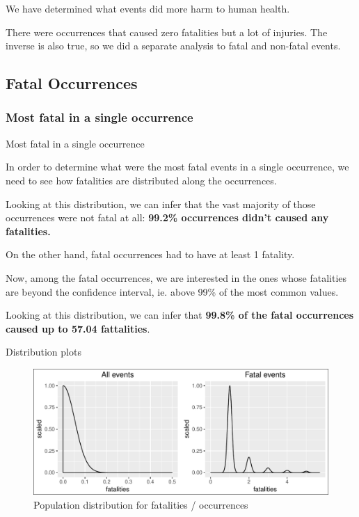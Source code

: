 \documentclass[]{article}
\begin{document}
We have determined what events did more harm to human health.

There were occurrences that caused zero fatalities but a lot of
injuries. The inverse is also true, so we did a separate analysis to
fatal and non-fatal events.

\subsection{Fatal Occurrences}\label{fatal-occurrences}

\subsubsection{Most fatal in a single
occurrence}\label{most-fatal-in-a-single-occurrence}

Most fatal in a single occurrence

In order to determine what were the most fatal events in a single
occurrence, we need to see how fatalities are distributed along the
occurrences.

Looking at this distribution, we can infer that the vast majority of
those occurrences were not fatal at all: \textbf{99.2\% occurrences
didn't caused any fatalities.}

On the other hand, fatal occurrences had to have at least 1 fatality.

Now, among the fatal occurrences, we are interested in the ones whose
fatalities are beyond the confidence interval, ie. above 99\% of the
most common values.

Looking at this distribution, we can infer that \textbf{99.8\% of the
fatal occurrences caused up to 57.04 fattalities}.

Distribution plots

\begin{figure}[htbp]
\centering
\includegraphics{readme_files/figure-latex/fatal-distr-4-1.pdf}
\caption{Population distribution for fatalities / occurrences}
\end{figure}
\end{document}
